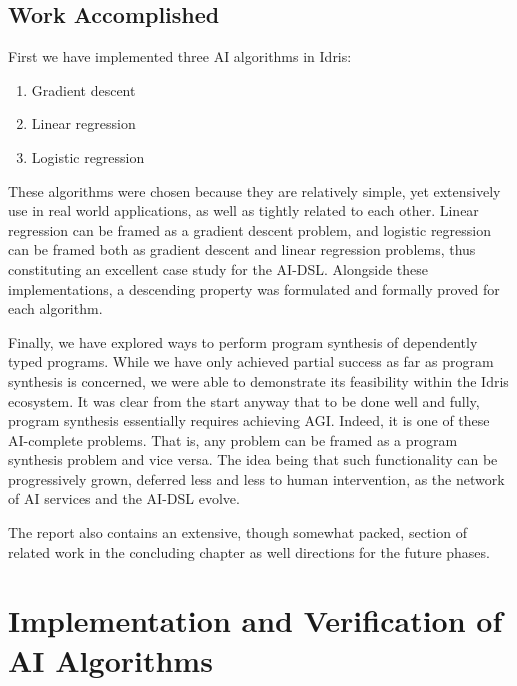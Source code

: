 \documentclass[]{report}
\begin{document}
\section{Work Accomplished}

First we have implemented three AI algorithms in Idris:
\begin{enumerate}
\item Gradient descent
\item Linear regression
\item Logistic regression
\end{enumerate}
These algorithms were chosen because they are relatively simple, yet
extensively use in real world applications, as well as tightly related
to each other.  Linear regression can be framed as a gradient descent
problem, and logistic regression can be framed both as gradient
descent and linear regression problems, thus constituting an excellent
case study for the AI-DSL.  Alongside these implementations, a
descending property was formulated and formally proved for each
algorithm.

Finally, we have explored ways to perform program synthesis of
dependently typed programs.  While we have only achieved partial
success as far as program synthesis is concerned, we were able to
demonstrate its feasibility within the Idris ecosystem.  It was clear
from the start anyway that to be done well and fully, program
synthesis essentially requires achieving AGI.  Indeed, it is one of
these AI-complete problems.  That is, any problem can be framed as a
program synthesis problem and vice versa.  The idea being that such
functionality can be progressively grown, deferred less and less to
human intervention, as the network of AI services and the AI-DSL
evolve.

The report also contains an extensive, though somewhat packed, section
of related work in the concluding chapter as well directions for the
future phases.

\chapter{Implementation and Verification of AI Algorithms}
\end{document}
